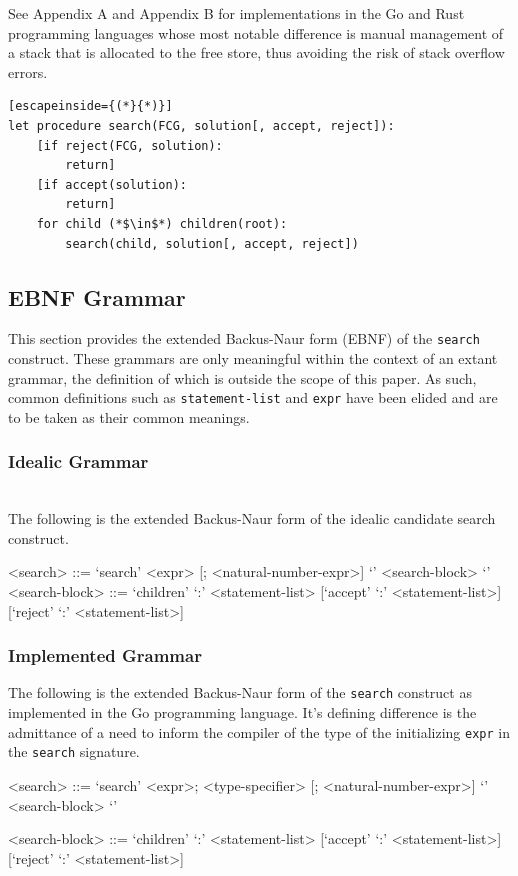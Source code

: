 \documentclass[runningheads]{llncs}
\newcommand{\code}[1]{\texttt{#1}}
\begin{document}
See Appendix A and Appendix B for implementations in the Go and Rust programming languages whose most notable difference is manual management of a stack that is allocated to the free store, thus avoiding the risk of stack overflow errors.

\begin{lstlisting}[escapeinside={(*}{*)}]
let procedure search(FCG, solution[, accept, reject]):
	[if reject(FCG, solution):
		return]
	[if accept(solution):
		return]
	for child (*$\in$*) children(root):
		search(child, solution[, accept, reject])
\end{lstlisting}

\subsection{EBNF Grammar}
This section provides the extended Backus-Naur form (EBNF) of the \code{search} construct. These grammars are only meaningful within the context of an extant grammar, the definition of which is outside the scope of this paper. As such, common definitions such as \code{statement-list} and \code{expr} have been elided and are to be taken as their common meanings.

\subsubsection{Idealic Grammar}~\\
The following is the extended Backus-Naur form of the idealic candidate search construct.

\begin{grammar}
<search> ::= `search' <expr> [; <natural-number-expr>] `{' <search-block> `}'
<search-block> ::= `children' `:' <statement-list> [`accept' `:' <statement-list>][`reject' `:' <statement-list>]
\end{grammar}

\subsubsection{Implemented Grammar}
The following is the extended Backus-Naur form of the \code{search} construct as implemented in the Go programming language. It's defining difference is the admittance of a need to inform the compiler of the type of the initializing \code{expr} in the \code{search} signature.

\begin{grammar}
<search> ::= `search' <expr>; <type-specifier> [; <natural-number-expr>] `{' <search-block> `}'

<search-block> ::= `children' `:' <statement-list> [`accept' `:' <statement-list>][`reject' `:' <statement-list>]
\end{grammar}
\end{document}
